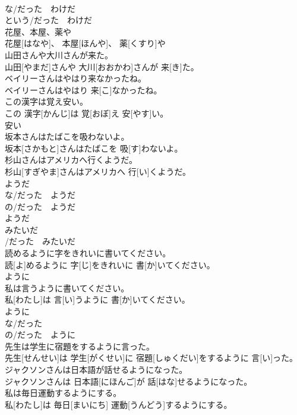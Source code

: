 \documentclass[8pt]{extreport}
\begin{document}
\begin{CJK}{UTF8}{min}
\\	な/だった　わけだ 
\\	という/だった　わけだ	
\\	花屋、本屋、薬や	
\\	花屋[はなや]、 本屋[ほんや]、 薬[くすり]や	
\\	山田さんや大川さんが来た。	
\\	山田[やまだ]さんや 大川[おおかわ]さんが 来[き]た。	
\\	ベイリーさんはやはり来なかったね。	
\\	ベイリーさんはやはり 来[こ]なかったね。	
\\	この漢字は覚え安い。	
\\	この 漢字[かんじ]は 覚[おぼ]え 安[やす]い。	
\\	安い	
\\	坂本さんはたばこを吸わないよ。	
\\	坂本[さかもと]さんはたばこを 吸[す]わないよ。	
\\	杉山さんはアメリカへ行くようだ。	
\\	杉山[すぎやま]さんはアメリカへ 行[い]くようだ。	
\\	ようだ 
\\	な/だった　ようだ 
\\	の/だった　ようだ 
\\	ようだ	
\\	みたいだ 
\\	/だった　みたいだ
\\	読めるように字をきれいに書いてください。	
\\	読[よ]めるように 字[じ]をきれいに 書[か]いてください。	
\\	ように	
\\	私は言うように書いてください。	
\\	私[わたし]は 言[い]うように 書[か]いてください。	
\\	ように 
\\	な/だった 
\\	の/だった　ように	
\\	先生は学生に宿題をするように言った。	
\\	先生[せんせい]は 学生[がくせい]に 宿題[しゅくだい]をするように 言[い]った。	
\\	ジャクソンさんは日本語が話せるようになった。	
\\	ジャクソンさんは 日本語[にほんご]が 話[はな]せるようになった。	
\\	私は毎日運動するようにする。	
\\	私[わたし]は 毎日[まいにち] 運動[うんどう]するようにする。	

\end{CJK}
\end{document}
